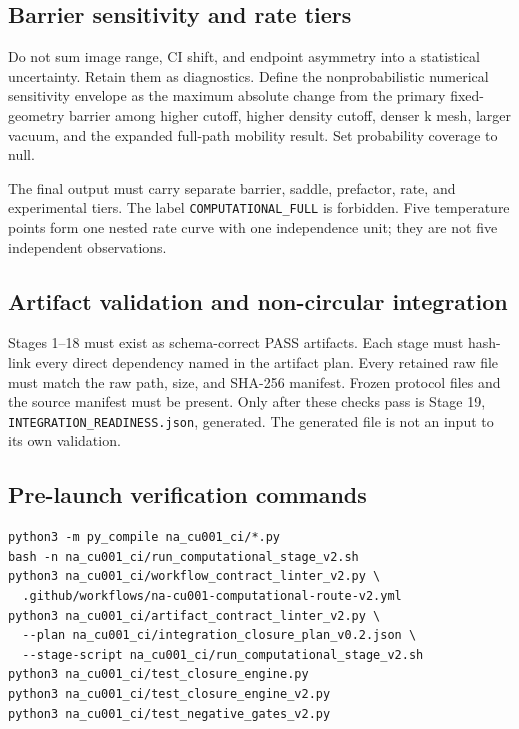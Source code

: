 \subsection*{Barrier sensitivity and rate tiers}

Do not sum image range, CI shift, and endpoint asymmetry into a statistical
uncertainty.  Retain them as diagnostics.  Define the nonprobabilistic numerical
sensitivity envelope as the maximum absolute change from the primary fixed-
geometry barrier among higher cutoff, higher density cutoff, denser k mesh,
larger vacuum, and the expanded full-path mobility result.  Set probability
coverage to null.

The final output must carry separate barrier, saddle, prefactor, rate, and
experimental tiers.  The label \texttt{COMPUTATIONAL\_FULL} is forbidden.  Five
temperature points form one nested rate curve with one independence unit; they
are not five independent observations.

\subsection*{Artifact validation and non-circular integration}

Stages 1--18 must exist as schema-correct PASS artifacts.  Each stage must
hash-link every direct dependency named in the artifact plan.  Every retained
raw file must match the raw path, size, and SHA-256 manifest.  Frozen protocol
files and the source manifest must be present.  Only after these checks pass is
Stage 19, \texttt{INTEGRATION\_READINESS.json}, generated.  The generated file
is not an input to its own validation.

\subsection*{Pre-launch verification commands}

\begin{verbatim}
python3 -m py_compile na_cu001_ci/*.py
bash -n na_cu001_ci/run_computational_stage_v2.sh
python3 na_cu001_ci/workflow_contract_linter_v2.py \
  .github/workflows/na-cu001-computational-route-v2.yml
python3 na_cu001_ci/artifact_contract_linter_v2.py \
  --plan na_cu001_ci/integration_closure_plan_v0.2.json \
  --stage-script na_cu001_ci/run_computational_stage_v2.sh
python3 na_cu001_ci/test_closure_engine.py
python3 na_cu001_ci/test_closure_engine_v2.py
python3 na_cu001_ci/test_negative_gates_v2.py
\end{verbatim}

